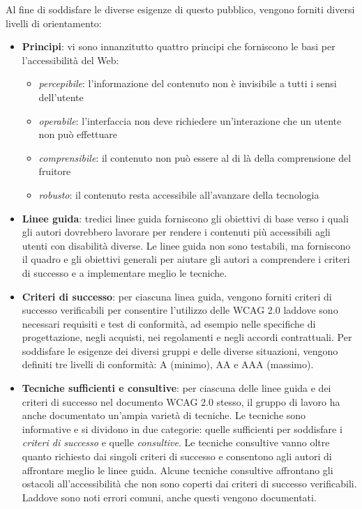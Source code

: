 Al fine di soddisfare le diverse esigenze di questo pubblico, vengono forniti diversi livelli di orientamento:
\begin{itemize}
\item \textbf{Principi}: vi sono innanzitutto quattro principi che forniscono le basi per l'accessibilità del Web:
\begin{itemize}
\item \textit{percepibile}: l'informazione del contenuto non è invisibile a tutti i sensi dell'utente
\item \textit{operabile}: l'interfaccia non deve richiedere un'interazione che un utente non può effettuare
\item \textit{comprensibile}: il contenuto non può essere al di là della comprensione del fruitore
\item \textit{robusto}: il contenuto resta accessibile all'avanzare della tecnologia
\end{itemize}
\item \textbf{Linee guida}: tredici linee guida forniscono gli obiettivi di base verso i quali gli autori dovrebbero lavorare per rendere i contenuti più accessibili agli utenti con disabilità diverse. Le linee guida non sono testabili, ma forniscono il quadro e gli obiettivi generali per aiutare gli autori a comprendere i criteri di successo e a implementare meglio le tecniche.
\item \textbf{Criteri di successo}: per ciascuna linea guida, vengono forniti criteri di successo verificabili per consentire l'utilizzo delle WCAG 2.0 laddove sono necessari requisiti e test di conformità, ad esempio nelle specifiche di progettazione, negli acquisti, nei regolamenti e negli accordi contrattuali. Per soddisfare le esigenze dei diversi gruppi e delle diverse situazioni, vengono definiti tre livelli di conformità: A (minimo), AA e AAA (massimo).
\item \textbf{Tecniche sufficienti e consultive}: per ciascuna delle linee guida e dei criteri di successo nel documento WCAG 2.0 stesso, il gruppo di lavoro ha anche documentato un'ampia varietà di tecniche. Le tecniche sono informative e si dividono in due categorie: quelle sufficienti per soddisfare i \textit{criteri di successo} e quelle \textit{consultive}. Le tecniche consultive vanno oltre quanto richiesto dai singoli criteri di successo e consentono agli autori di affrontare meglio le linee guida. Alcune tecniche consultive affrontano gli ostacoli all'accessibilità che non sono coperti dai criteri di successo verificabili. Laddove sono noti errori comuni, anche questi vengono documentati.
\end{itemize}

